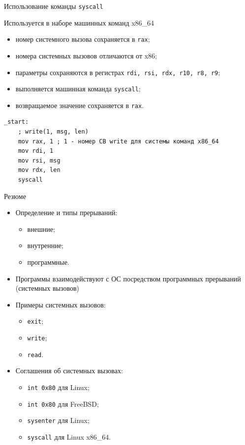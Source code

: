 \documentclass[utf8, russian, aspectratio=1610]{beamer}
\begin{document}
\begin{frame}[fragile]{Использование команды {\tt syscall}}

    Используется в наборе машинных команд x86\_64
    \begin{itemize}
         \item номер системного вызова сохраняется в {\tt rax};
         \item номера системных вызовов отличаются от x86;
         \item параметры сохраняются в регистрах {\tt rdi, rsi, rdx, r10, r8, r9};
         \item выполняется машинная команда {\tt syscall};
         \item возвращаемое значение сохраняется в {\tt rax}.
    \end{itemize}
\begin{verbatim}
_start:
    ; write(1, msg, len)
    mov rax, 1 ; 1 - номер СВ write для системы команд x86_64
    mov rdi, 1
    mov rsi, msg
    mov rdx, len
    syscall
\end{verbatim}
\end{frame}

\begin{frame}{Резюме}
    \begin{itemize}
        \item Определение и типы прерываний:
        \begin{itemize}
            \item внешние;
            \item внутренние;
            \item программные.
        \end{itemize}
        \item Программы взаимодействуют с ОС посредством программных прерываний (системных вызовов)
        \item Примеры системных вызовов:
        \begin{itemize}
            \item {\tt exit};
            \item {\tt write};
            \item {\tt read}.
        \end{itemize}
        \item Соглашения об системных вызовах:
        \begin{itemize}
            \item {\tt int 0x80} для Linux;
            \item {\tt int 0x80} для FreeBSD;
            \item {\tt sysenter} для Linux;
            \item {\tt syscall} для Linux x86\_64.
        \end{itemize}
    \end{itemize}
\end{frame}
\end{document}
